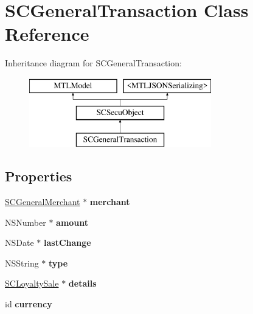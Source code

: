 \hypertarget{interface_s_c_general_transaction}{}\section{S\+C\+General\+Transaction Class Reference}
\label{interface_s_c_general_transaction}
Inheritance diagram for S\+C\+General\+Transaction\+:\begin{figure}[H]
\begin{center}
\leavevmode
\includegraphics[height=3.000000cm]{interface_s_c_general_transaction}
\end{center}
\end{figure}
\subsection*{Properties}
\begin{DoxyCompactItemize}
\item 
\hyperlink{interface_s_c_general_merchant}{S\+C\+General\+Merchant} $\ast$ {\bfseries merchant}\hypertarget{interface_s_c_general_transaction_abe2efb2ebe41f635a0b7ad7abf9295d2}{}\label{interface_s_c_general_transaction_abe2efb2ebe41f635a0b7ad7abf9295d2}

\item 
N\+S\+Number $\ast$ {\bfseries amount}\hypertarget{interface_s_c_general_transaction_a7265e565383cfd433c5fd6cebc6ec222}{}\label{interface_s_c_general_transaction_a7265e565383cfd433c5fd6cebc6ec222}

\item 
N\+S\+Date $\ast$ {\bfseries last\+Change}\hypertarget{interface_s_c_general_transaction_ae8722532ccd2c9fd654641fd72cfcfc3}{}\label{interface_s_c_general_transaction_ae8722532ccd2c9fd654641fd72cfcfc3}

\item 
N\+S\+String $\ast$ {\bfseries type}\hypertarget{interface_s_c_general_transaction_ae427454ac6873a9a8e571a91da6bfa1e}{}\label{interface_s_c_general_transaction_ae427454ac6873a9a8e571a91da6bfa1e}

\item 
\hyperlink{interface_s_c_loyalty_sale}{S\+C\+Loyalty\+Sale} $\ast$ {\bfseries details}\hypertarget{interface_s_c_general_transaction_a6946365f8bfcb4eec372f76ae9d943a5}{}\label{interface_s_c_general_transaction_a6946365f8bfcb4eec372f76ae9d943a5}

\item 
id {\bfseries currency}\hypertarget{interface_s_c_general_transaction_a556db1c1f0a89312217ab055fd3a0378}{}\label{interface_s_c_general_transaction_a556db1c1f0a89312217ab055fd3a0378}

\end{DoxyCompactItemize}

